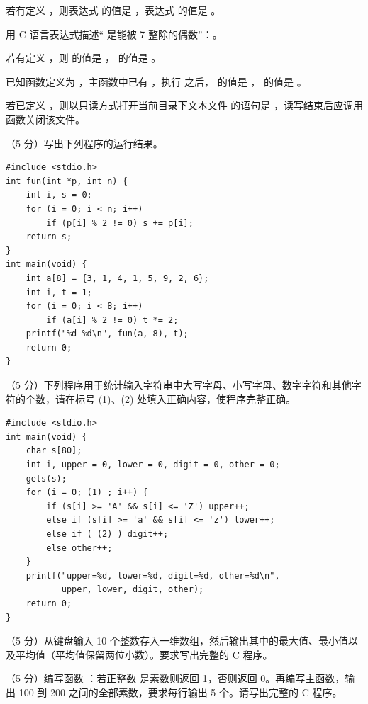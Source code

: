\documentclass[a4paper,11pt]{article}
\begin{document}
\begin{qgroup}
\q 若有定义 ，则表达式  的值是 \fillblank{}，表达式  的值是 \fillblank{}。

\q 用 C 语言表达式描述“ 是能被 7 整除的偶数”：\fillblank{}。

\q 若有定义 ，则  的值是 \fillblank{}， 的值是 \fillblank{}。

\q 已知函数定义为 ，主函数中已有 ，执行  之后， 的值是 \fillblank{}， 的值是 \fillblank{}。

\q 若已定义 ，则以只读方式打开当前目录下文本文件  的语句是 ，读写结束后应调用 \fillblank{} 函数关闭该文件。
\end{qgroup}

\begin{qgroup}
\q （5 分）写出下列程序的运行结果。
\begin{lstlisting}[language={[custom]C}]
#include <stdio.h>
int fun(int *p, int n) {
    int i, s = 0;
    for (i = 0; i < n; i++)
        if (p[i] % 2 != 0) s += p[i];
    return s;
}
int main(void) {
    int a[8] = {3, 1, 4, 1, 5, 9, 2, 6};
    int i, t = 1;
    for (i = 0; i < 8; i++)
        if (a[i] % 2 != 0) t *= 2;
    printf("%d %d\n", fun(a, 8), t);
    return 0;
}
\end{lstlisting}
\anslines{1.5cm}

\q （5 分）下列程序用于统计输入字符串中大写字母、小写字母、数字字符和其他字符的个数，请在标号 (1)、(2) 处填入正确内容，使程序完整正确。
\begin{lstlisting}[language={[custom]C}]
#include <stdio.h>
int main(void) {
    char s[80];
    int i, upper = 0, lower = 0, digit = 0, other = 0;
    gets(s);
    for (i = 0; (1) ; i++) {
        if (s[i] >= 'A' && s[i] <= 'Z') upper++;
        else if (s[i] >= 'a' && s[i] <= 'z') lower++;
        else if ( (2) ) digit++;
        else other++;
    }
    printf("upper=%d, lower=%d, digit=%d, other=%d\n",
           upper, lower, digit, other);
    return 0;
}
\end{lstlisting}
\anslines{1.0cm}
\end{qgroup}

\begin{qgroup}
\q （5 分）从键盘输入 10 个整数存入一维数组，然后输出其中的最大值、最小值以及平均值（平均值保留两位小数）。要求写出完整的 C 程序。
\anslines{5.0cm}

\q （5 分）编写函数 ：若正整数  是素数则返回 1，否则返回 0。再编写主函数，输出 100 到 200 之间的全部素数，要求每行输出 5 个。请写出完整的 C 程序。
\anslines{5.0cm}
\end{qgroup}
\end{document}
